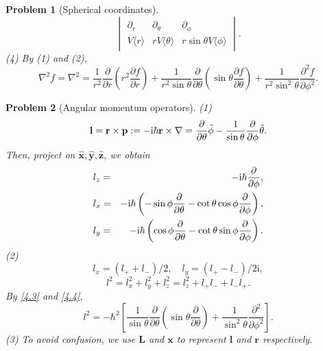 \documentclass{article}
\theoremstyle{1}
\newtheorem{problem}{Problem}
\newcommand{\ii}{\mathrm{i}}
\begin{document}
\begin{problem}[Spherical coordinates]
\begin{equation}
\begin{vmatrix}
  \partial _r& \partial _\theta  & \partial _\phi \\
 V\langle r\rangle  &rV\langle\theta \rangle   &r\sin\theta V\langle \phi\rangle 
\end{vmatrix}.
    \end{equation}
    (4) By (1) and (2),
    \begin{equation}
        \nabla^2 f=
\nabla^2 = \frac{1}{r^2} \frac{\partial }{\partial r} \left( r^2 \frac{\partial f}{\partial r} \right)
+ \frac{1}{r^2 \sin\theta} \frac{\partial}{\partial \theta} \left( \sin\theta \frac{\partial f}{\partial \theta} \right)
+ \frac{1}{r^2 \sin^2\theta} \frac{\partial^2 f}{\partial \phi^2}.
    \end{equation}

\end{problem}
\begin{problem}[Angular momentum operators]
    (1) 
    \begin{equation}
        \mathbf{l}=\mathbf{r}\times\mathbf{p}:=-\ii\hbar\mathbf{r}\times\nabla=\pdv{\theta}\hat{\mathbf{\phi}}-\frac{1}{\sin\theta}\pdv{\phi}\hat{\mathbf{\theta}}.
    \end{equation}
    Then, project on $\hat{\mathbf{x}},\hat{\mathbf{y}},\hat{\mathbf{z}}$, we obtain
    \begin{eqnarray}
    &l_z=&-\ii \hbar \pdv{\phi},\\
    &l_x=&-\ii \hbar \left(-\sin \phi \pdv{\theta}-\cot\theta\cos\phi \pdv{\phi}\right),\label{4.3}\\
    &l_y=&-\ii \hbar \left(\cos \phi \pdv{\theta}-\cot\theta\sin\phi \pdv{\phi}\right).\label{4.4}
\end{eqnarray}
(2) \begin{equation}
    l_x=\left(l_++l_-\right)/2,\quad l_y=\left(l_+-l_-\right)/2\ii,
\end{equation}
\begin{equation}
    l^2=l_x^2+l_y^2+l_z^2=l_z^2+l_+l_-+l_-l_+.
\end{equation}
By \eqref{4.3} and \eqref{4.4}, 
\begin{equation}
    l^2=-\hbar^2\left[ \frac{1}{ \sin\theta} \frac{\partial}{\partial \theta} \left( \sin\theta \frac{\partial }{\partial \theta} \right)
+ \frac{1}{ \sin^2\theta} \frac{\partial^2 }{\partial \phi^2}\right].
\end{equation}
(3) To avoid confusion, we use $\mathbf{L}$ and $\mathbf{x}$ to represent $\mathbf{l}$ and $\mathbf{r}$ respectively.
\begin{equation}

\end{equation}
\end{problem}
\end{document}
